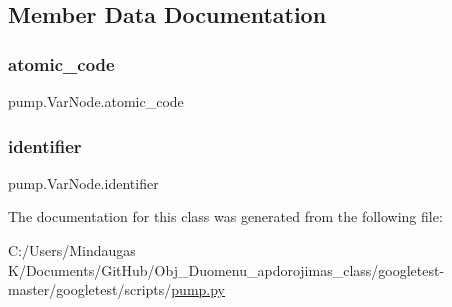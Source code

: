 \subsection{Member Data Documentation}
\mbox{\label{classpump_1_1_var_node_ad6bef6a8577b994fbe9ccddf3c82d2fc}} 
\subsubsection{\texorpdfstring{atomic\_code}{atomic\_code}}
{\footnotesize\ttfamily pump.\+Var\+Node.\+atomic\+\_\+code}

\mbox{\label{classpump_1_1_var_node_aa2b634e2443646c3754f2d193efa4dc7}} 
\subsubsection{\texorpdfstring{identifier}{identifier}}
{\footnotesize\ttfamily pump.\+Var\+Node.\+identifier}



The documentation for this class was generated from the following file\+:\begin{DoxyCompactItemize}
\item 
C\+:/\+Users/\+Mindaugas K/\+Documents/\+Git\+Hub/\+Obj\+\_\+\+Duomenu\+\_\+apdorojimas\+\_\+class/googletest-\/master/googletest/scripts/\mbox{\hyperlink{googletest-master_2googletest_2scripts_2pump_8py}{pump.\+py}}\end{DoxyCompactItemize}

